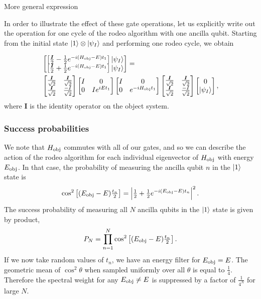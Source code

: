 \documentclass{beamer}
\begin{document}
\begin{frame}{More general expression}

In order to illustrate the effect of these gate operations, let us
explicitly write out the operation for one cycle of the rodeo
algorithm with one ancilla qubit.  Starting from the initial state
$\ket{1} \otimes \ket{\psi_I}$ and performing one rodeo cycle, we
obtain


\begin{align*}
& \begin{bmatrix}
\left[ \tfrac{\bm{I}}{2}-\tfrac{1}{2}e^{-i(H_{\rm obj}-E)t_1} \right] \ket{\psi_I} \\
\left[ \tfrac{\bm{I}}{2}+\tfrac{1}{2}e^{-i(H_{\rm obj}-E)t_1} \right] \ket{\psi_I}
\end{bmatrix} =  \nonumber \\
& \begin{bmatrix}
\tfrac{\bm{I}}{\sqrt{2}} &
\tfrac{\bm{I}}{\sqrt{2}}\\
\tfrac{\bm{I}}{\sqrt{2}}& 
\tfrac{-I}{\sqrt{2}}
\end{bmatrix}
\begin{bmatrix}
 I & 0 \\
0 & Ie^{iEt_1} 
\end{bmatrix}
 \begin{bmatrix}
 I & 0 \\
0 & e^{-iH_{\rm obj}t_1}
\end{bmatrix} 
\begin{bmatrix}
\tfrac{\bm{I}}{\sqrt{2}} & 
\tfrac{\bm{I}}{\sqrt{2}}\\
\tfrac{\bm{I}}{\sqrt{2}} & 
\tfrac{-I}{\sqrt{2}}
\end{bmatrix}
\begin{bmatrix}
0 \\
\ket{\psi_I}
\end{bmatrix},
\label{one_rodeo}
\end{align*}
where $\bm{I}$ is the identity operator on the object system.


\end{frame}



\begin{frame}
\frametitle{Success probabilities}
We note that $H_{\rm obj}$ commutes with all of our gates, and so we can describe the action of the rodeo algorithm for each individual eigenvector of $H_{\rm obj}$ with energy $E_{\rm obj}$.  In that case, the probability of measuring the ancilla qubit $n$ in the $\ket{1}$ state is 
\[
   \cos^2\left[(E_{\rm obj}
   -E)\tfrac{t_n}{2}\right] = \left\vert \tfrac{1}{2}+
   \tfrac{1}{2}e^{-i(E_{\rm obj}-E)t_n} \right\vert^2.
\]
The success probability of measuring all $N$ ancilla qubits in the $\ket{1}$ state is given by product, 
\[
   P_N =\prod_{n=1}^N \cos^2\left[(E_{\rm obj}
   -E)\tfrac{t_n}{2}\right]. \label{prob}
\]
If we now take random values of $t_n$, we have an energy filter for $E_{\rm obj}=E$.  The geometric mean of $\cos^2\theta$ when sampled uniformly over all $\theta$ is equal to $\tfrac{1}{4}$.  Therefore the spectral weight for any $E_{\rm obj}\ne E$ is suppressed by a factor of $\tfrac{1}{4^N}$ for large $N$.


\end{frame}
\end{document}
